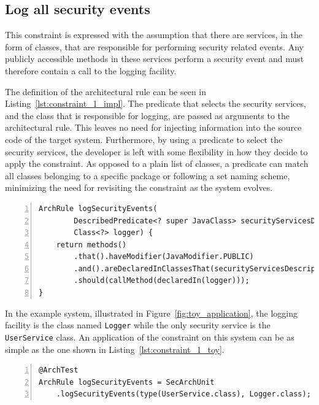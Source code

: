 \subsection{Log all security events}
This constraint is expressed with the assumption that there are services, in the form of classes, that are responsible for performing security related events. Any publicly accessible methods in these services perform a security event and must therefore contain a call to the logging facility.

The definition of the architectural rule can be seen in Listing~\ref{lst:constraint_1_impl}. The predicate that selects the security services, and the class that is responsible for logging, are passed as arguments to the architectural rule. This leaves no need for injecting information into the source code of the target system. Furthermore, by using a predicate to select the security services, the developer is left with some flexibility in how they decide to apply the constraint. As opposed to a plain list of classes, a predicate can match all classes belonging to a specific package or following a set naming scheme, minimizing the need for revisiting the constraint as the system evolves.

\begin{minipage}{\linewidth}
\begin{lstlisting}[caption={Rule definition for constraint 1.}, captionpos=b, label=lst:constraint_1_impl, numbers=left]
ArchRule logSecurityEvents(
        DescribedPredicate<? super JavaClass> securityServicesDescriptor,
        Class<?> logger) {
    return methods()
        .that().haveModifier(JavaModifier.PUBLIC)
        .and().areDeclaredInClassesThat(securityServicesDescriptor)
        .should(callMethod(declaredIn(logger)));
}
\end{lstlisting}
\end{minipage}

In the example system, illustrated in Figure~\ref{fig:toy_application}, the logging facility is the class named \texttt{Logger} while the only security service is the \texttt{UserService} class. An application of the constraint on this system can be as simple as the one shown in Listing~\ref{lst:constraint_1_toy}.

\begin{minipage}{\linewidth}
\begin{lstlisting}[caption={Application of constraint 1 to the example system.}, captionpos=b, label=lst:constraint_1_toy, numbers=left]
@ArchTest
ArchRule logSecurityEvents = SecArchUnit
    .logSecurityEvents(type(UserService.class), Logger.class);
\end{lstlisting}
\end{minipage}

